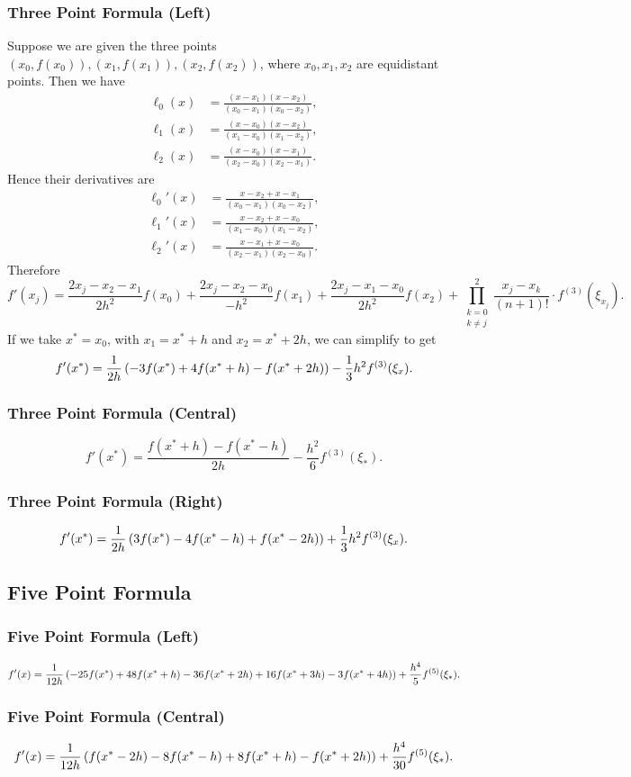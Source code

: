 \documentclass[class=article, crop=false]{standalone}
\begin{document}
  \subsubsection{Three Point Formula (Left)}
  Suppose we are given the three points $(x_0, f(x_0)), (x_1, f(x_1)), (x_2, f(x_2))$, where $x_0, x_1, x_2$ are equidistant points. Then we have
  \begin{align*}
    \ell_0(x) &= \frac{(x - x_1)(x - x_2)}{(x_0 - x_1)(x_0 - x_2)}, \\
    \ell_1(x) &= \frac{(x - x_0)(x - x_2)}{(x_1 - x_0)(x_1 - x_2)}, \\
    \ell_2(x) &= \frac{(x - x_0)(x - x_1)}{(x_2 - x_0)(x_2 - x_1)}.
  \end{align*}
  Hence their derivatives are
  \begin{align*}
    \ell_0'(x) &= \frac{x - x_2 + x - x_1}{(x_0 - x_1)(x_0 - x_2)}, \\
    \ell_1'(x) &= \frac{x - x_2 + x - x_0}{(x_1 - x_0)(x_1 - x_2)}, \\
    \ell_2'(x) &= \frac{x - x_1 + x - x_0}{(x_2 - x_1)(x_2 - x_0)}.
  \end{align*}
  Therefore
  \[
    f'(x_j) = \frac{2x_j - x_2 - x_1}{2h^2}f(x_0) + \frac{2x_j - x_2 - x_0}{-h^2}f(x_1) + \frac{2x_j - x_1 - x_0}{2h^2}f(x_2) + \prod_{\substack{k = 0\\k\neq j}}^{2} \frac{x_j - x_k}{(n + 1)!}\cdot f^{(3)}(\xi_{x_j}).
  \]
  If we take $x^* = x_0$, with $x_1 = x^* + h$ and $x_2 = x^* + 2h$, we can simplify to get
  \[
    f'(x^*) = \frac{1}{2h}\left( -3f(x^*) + 4f(x^* + h) - f(x^* + 2h) \right) - \frac{1}{3}h^2f^{(3)}(\xi_x).
  \]
  \subsubsection{Three Point Formula (Central)}
  \[
    f'(x^*) = \frac{f(x^* + h) - f(x^* - h)}{2h} - \frac{h^2}{6}f^{(3)}(\xi_*).
  \]
  \subsubsection{Three Point Formula (Right)}
  \[
    f'(x^*) = \frac{1}{2h}\left( 3f(x^*) - 4f(x^* - h) + f(x^* - 2h) \right) + \frac{1}{3}h^2f^{(3)}(\xi_x).
  \]
  \subsection{Five Point Formula}
  \subsubsection{Five Point Formula (Left)}
  \[
    f'(x) = \frac{1}{12h}\left( -25f(x^*) + 48f(x^* + h) - 36f(x^* + 2h) + 16f(x^* + 3h) - 3f(x^* + 4h) \right) + \frac{h^4}{5}f^{(5)}(\xi_*).
  \]
  \subsubsection{Five Point Formula (Central)}
  \[
    f'(x) = \frac{1}{12h}\left( f(x^* - 2h) - 8f(x^* - h) + 8f(x^* + h) - f(x^* + 2h) \right) + \frac{h^4}{30}f^{(5)}(\xi_*).
  \]
\end{document}
